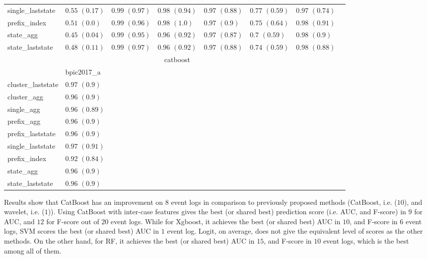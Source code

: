 \begin{table}[!htbp]
{\begin{tabular}{llllllll}
			single\_laststate & $0.55$ ${(0.17)}$ & $\mathbf{0.99}$ $\mathbf{(0.97)}$  & $\mathbf{0.98}$ $\mathbf{(0.94)}$  & $0.97$ ${(0.88)}$ & $0.77$ ${(0.59)}$ & $0.97$ ${(0.74)}$ \\
			prefix\_index & $0.51$ ${(0.0)}$ & $\mathbf{0.99}$ $\mathbf{(0.96)}$  & $\mathbf{0.98}$ $\mathbf{(1.0)}$  & $0.97$ ${(0.9)}$ & $0.75$ ${(0.64)}$ & $\mathbf{0.98}$ $\mathbf{(0.91)}$  \\
			state\_agg & $0.45$ ${(0.04)}$ & $\mathbf{0.99}$ $\mathbf{(0.95)}$  & $0.96$ ${(0.92)}$ & $0.97$ ${(0.87)}$ & $0.7$ ${(0.59)}$ & $0.98$ ${(0.9)}$ \\
			state\_laststate & $0.48$ ${(0.11)}$ & $\mathbf{0.99}$ $\mathbf{(0.97)}$  & $0.96$ ${(0.92)}$ & $0.97$ ${(0.88)}$ & $0.74$ ${(0.59)}$ & $0.98$ ${(0.88)}$ \\
			\bottomrule
			\toprule
			& \multicolumn{5}{c}{catboost}
			\\
			& bpic2017\_a
			\\ \midrule
			cluster\_laststate & $\mathbf{0.97}$ $\mathbf{(0.9)}$  \\
			cluster\_agg & $0.96$ ${(0.9)}$ \\
			single\_agg & $0.96$ ${(0.89)}$ \\
			prefix\_agg & $0.96$ ${(0.9)}$ \\
			prefix\_laststate & $0.96$ ${(0.9)}$ \\
			single\_laststate & $\mathbf{0.97}$ $\mathbf{(0.91)}$  \\
			prefix\_index & $0.92$ ${(0.84)}$ \\
			state\_agg & $0.96$ ${(0.9)}$ \\
			state\_laststate & $0.96$ ${(0.9)}$ \\
			\bottomrule
			
		\end{tabular}%
	}
\end{table}

Results show that CatBoost has an improvement on $8$ event logs in comparison to previously proposed methods (CatBoost, i.e. ($10$), and wavelet, i.e. ($1$)). 
Using CatBoost with inter-case features gives the best (or shared best) prediction score (i.e. AUC, and F-score) in $9$ for AUC, and $12$ for F-score out of $20$ event logs. While for Xgboost, it achieves the best (or shared best)  AUC in $10$, and F-score in $6$ event logs, SVM scores the best (or shared best) AUC in $1$ event log. Logit, on average, does not give the equivalent level of scores as the other methods. On the other hand, for RF, it achieves the best (or shared best) AUC in $15$, and F-score in $10$ event logs, which is the best among all of them.

